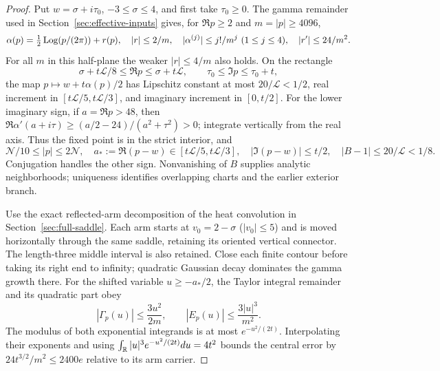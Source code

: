 \begin{proof}
Put $w=\sigma+i\tau_0$, $-3\le\sigma\le4$, and first take
$\tau_0\ge0$. The gamma remainder used in
Section~\ref{sec:effective-inputs} gives, for $\Re p\ge2$ and
$m=|p|\ge4096$,
\[
 \alpha(p)=\tfrac12\operatorname{Log}(p/(2\pi))+r(p),\quad |r|\le2/m,
 \quad |\alpha^{(j)}|\le j!/m^j\ (1\le j\le4),
 \quad |r'|\le24/m^2.
\]
For all $m$ in this half-plane the weaker $|r|\le4/m$ also holds.
On the rectangle
\[
 \sigma+t\mathcal L/8\le\Re p\le\sigma+t\mathcal L,
 \qquad \tau_0\le\Im p\le\tau_0+t,
\]
the map $p\mapsto w+t\alpha(p)/2$ has Lipschitz constant at most
$20/\mathcal L<1/2$, real increment in
$[t\mathcal L/5,t\mathcal L/3]$, and imaginary increment in $[0,t/2]$.
For the lower imaginary sign, if $a=\Re p>48$, then
$\Re\alpha'(a+i\tau)\ge(a/2-24)/(a^2+\tau^2)>0$; integrate
vertically from the real axis. Thus the fixed point is in the strict
interior, and
\begin{equation}
 \mathcal N/10\le|p|\le2\mathcal N,\quad
 a_*:=\Re(p-w)\in[t\mathcal L/5,t\mathcal L/3],\quad
 |\Im(p-w)|\le t/2,\quad |B-1|\le20/\mathcal L<1/8.
 \label{eq:ep-branch}
\end{equation}
Conjugation handles the other sign. Nonvanishing of $B$ supplies analytic
neighborhoods; uniqueness identifies overlapping charts and the earlier
exterior branch.

Use the exact reflected-arm decomposition of the heat convolution in
Section~\ref{sec:full-saddle}. Each arm starts at $v_0=2-\sigma$
($|v_0|\le5$) and is moved horizontally through the same saddle, retaining
its oriented vertical connector. The length-three middle interval is
also retained. Close each finite contour before taking its right end to
infinity; quadratic Gaussian decay dominates the gamma growth there.
For the shifted variable $u\ge-a_*/2$, the Taylor integral remainder
and its quadratic part obey
\[
 |\Gamma_p(u)|\le\frac{3u^2}{2m},\qquad
 |E_p(u)|\le\frac{3|u|^3}{m^2}.
\]
The modulus of both exponential integrands is at most
$e^{-u^2/(2t)}$. Interpolating their exponents and using
$\int_\mathbb R |u|^3e^{-u^2/(2t)}du=4t^2$ bounds the central error by
$24t^{3/2}/m^2\le2400e$ relative to its arm carrier.


\end{proof}
